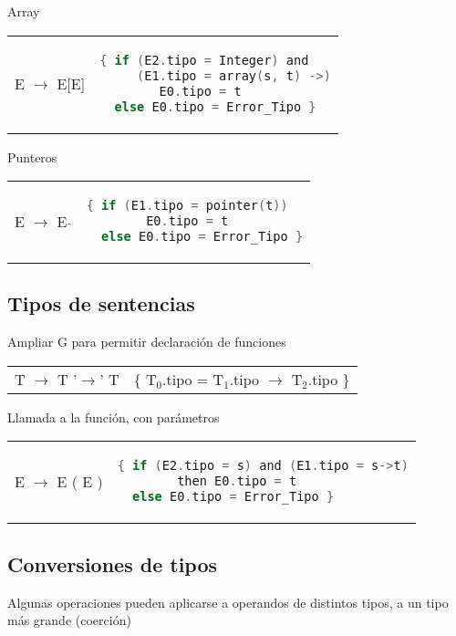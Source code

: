 \documentclass[12pt, twoside, openright]{report} %
\begin{document}
Array
\begin{table}[H]
	\begin{tabular}{ll}
		E $\rightarrow$ E[E] &
		\textbf{ } \begin{lstlisting}[language=C]
{ if (E2.tipo = Integer) and
     (E1.tipo = array(s, t) ->)
        E0.tipo = t
  else E0.tipo = Error_Tipo }
\end{lstlisting} \\
	\end{tabular}
\end{table}

Punteros
\begin{table}[H]
	\begin{tabular}{ll}
		E $\rightarrow$ E $\hat{}$ &
		\textbf{ } \begin{lstlisting}[language=C]
{ if (E1.tipo = pointer(t))
        E0.tipo = t
  else E0.tipo = Error_Tipo }
\end{lstlisting} \\
	\end{tabular}
\end{table}

\subsection{Tipos de sentencias}
Ampliar G para permitir declaración de funciones
\begin{table}[H]
	\begin{tabular}{ll}
		T $\rightarrow$ T '$\rightarrow$' T & \{ T$_0$.tipo = T$_1$.tipo $\rightarrow$ T$_2$.tipo \} \\
	\end{tabular}
\end{table}

Llamada a la función, con parámetros
\begin{table}[H]
	\begin{tabular}{ll}
		E $\rightarrow$ E ( E ) &
		\textbf{ } \begin{lstlisting}[language=C]
{ if (E2.tipo = s) and (E1.tipo = s->t)
        then E0.tipo = t
  else E0.tipo = Error_Tipo }
\end{lstlisting} \\
	\end{tabular}
\end{table}

\subsection{Conversiones de tipos}
Algunas operaciones pueden aplicarse a operandos de distintos tipos, a un tipo más grande  (coerción)
\end{document}

